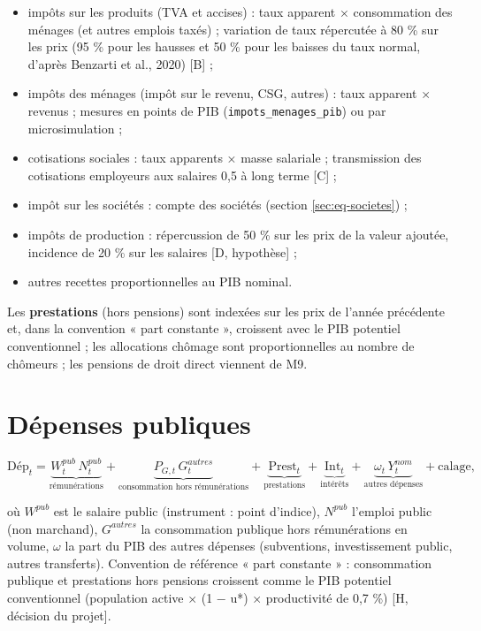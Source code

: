 \documentclass[
  11pt,
  11pt,
  a4paper,
  openany]{book}
\providecommand{\tightlist}{%
  \setlength{\itemsep}{0pt}\setlength{\parskip}{0pt}}
\begin{document}
\begin{itemize}
\tightlist
\item
  impôts sur les produits (TVA et accises) : taux apparent ×
  consommation des ménages (et autres emplois taxés) ; variation de taux
  répercutée à 80 \% sur les prix (95 \% pour les hausses et 50 \% pour
  les baisses du taux normal, d'après Benzarti et al., 2020) {[}B{]} ;
\item
  impôts des ménages (impôt sur le revenu, CSG, autres) : taux apparent
  × revenus ; mesures en points de PIB (\texttt{impots\_menages\_pib})
  ou par microsimulation ;
\item
  cotisations sociales : taux apparents × masse salariale ; transmission
  des cotisations employeurs aux salaires 0,5 à long terme {[}C{]} ;
\item
  impôt sur les sociétés : compte des sociétés (section
  \ref{sec:eq-societes}) ;
\item
  impôts de production : répercussion de 50 \% sur les prix de la valeur
  ajoutée, incidence de 20 \% sur les salaires {[}D, hypothèse{]} ;
\item
  autres recettes proportionnelles au PIB nominal.
\end{itemize}

Les \textbf{prestations} (hors pensions) sont indexées sur les prix de
l'année précédente et, dans la convention « part constante », croissent
avec le PIB potentiel conventionnel ; les allocations chômage sont
proportionnelles au nombre de chômeurs ; les pensions de droit direct
viennent de M9.

\hypertarget{sec:eq-depenses}{%
\section{Dépenses publiques}\label{sec:eq-depenses}}

\[\text{Dép}_t = \underbrace{W^{pub}_t\,N^{pub}_t}_{\text{rémunérations}} + \underbrace{P_{G,t}\,G^{autres}_t}_{\text{consommation hors rémunérations}} + \underbrace{\text{Prest}_t}_{\text{prestations}} + \underbrace{\text{Int}_t}_{\text{intérêts}} + \underbrace{\omega_t\,Y^{nom}_t}_{\text{autres dépenses}} + \text{calage},\]

où \(W^{pub}\) est le salaire public (instrument : point d'indice),
\(N^{pub}\) l'emploi public (non marchand), \(G^{autres}\) la
consommation publique hors rémunérations en volume, \(\omega\) la part
du PIB des autres dépenses (subventions, investissement public, autres
transferts). Convention de référence « part constante » : consommation
publique et prestations hors pensions croissent comme le PIB potentiel
conventionnel (population active × (1 − u*) × productivité de 0,7 \%)
{[}H, décision du projet{]}.
\end{document}
